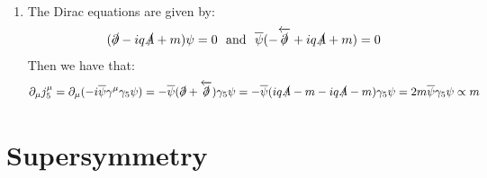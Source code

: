 \documentclass[10pt,a4paper]{article}
\begin{document}
\begin{enumerate}
\item The Dirac equations are given by:
\[
(\slashed{\partial} - i q \slashed{A} + m) \psi = 0 \mbox{~~and~~} \overline{\psi}(- \overleftarrow{\slashed{\partial}} + i q \slashed{A} + m) = 0 
\] 
Then we have that:
\[
\partial_\mu j_5^\mu = \partial_\mu (-i \overline{\psi} \gamma^\mu \gamma_5 \psi) = - \overline{\psi}( \slashed{\partial} + \overleftarrow{\slashed{\partial}} ) \gamma_5 \psi = - \overline{\psi}( i q \slashed{A} - m - i q \slashed{A} - m)\gamma_5 \psi = 2m \overline{\psi}\gamma_5 \psi \propto m 
\]
\end{enumerate}

\section{Supersymmetry}
\end{document}
